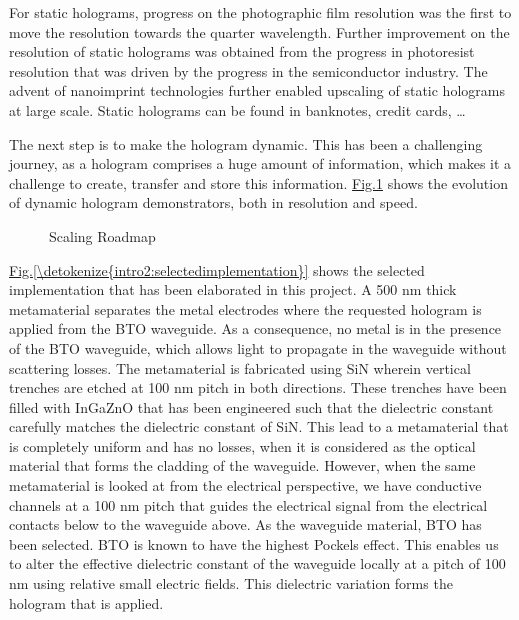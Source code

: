 \documentclass[a4paper,10pt,english,openany,oneside]{jupyterBook}
\begin{document}
\sphinxAtStartPar
For static holograms, progress on the photographic film resolution was the first to move the resolution towards the quarter wavelength. Further improvement on the resolution of static holograms was obtained from the progress in photoresist resolution that was driven by the progress in the semiconductor industry. The advent of nano\sphinxhyphen{}imprint technologies further enabled upscaling of static holograms at large scale. Static holograms can be found in banknotes, credit cards, …

\sphinxAtStartPar
The next step is to make the hologram dynamic. This has been a challenging journey, as a hologram comprises a huge amount of information, which makes it a challenge to create, transfer and store this information. \hyperref[\detokenize{intro2:scalingroadmap}]{Fig.\@ \ref{\detokenize{intro2:scalingroadmap}}} shows the evolution of dynamic hologram demonstrators, both in resolution and speed.

\begin{figure}[htbp]
\centering
\capstart

\noindent{}
\caption{Scaling Roadmap}\label{\detokenize{intro2:scalingroadmap}}\end{figure}

\begin{DUlineblock}{0em}
\item[] 
\end{DUlineblock}

\sphinxAtStartPar
\hyperref[\detokenize{intro2:selectedimplementation}]{Fig.\@ \ref{\detokenize{intro2:selectedimplementation}}} shows the selected implementation that has been elaborated in this project. A 500 nm thick metamaterial separates the metal electrodes where the requested hologram is applied from the BTO waveguide. As a consequence, no metal is in the presence of the BTO waveguide, which allows light to propagate in the waveguide without scattering losses. The metamaterial is fabricated using SiN wherein vertical trenches are etched at 100 nm pitch in both directions. These trenches have been filled with InGaZnO that has been engineered such that the dielectric constant carefully matches the dielectric constant of SiN.  This lead to a metamaterial that is completely uniform and has no losses, when it is considered as the optical material that forms the cladding of the waveguide. However, when the same metamaterial is looked at from the electrical perspective, we have conductive channels at a 100 nm pitch that guides the electrical signal from the electrical contacts below to the waveguide above.
As the waveguide material, BTO has been selected. BTO is known to have the highest Pockels effect. This enables us to alter the effective dielectric constant of the waveguide locally at a pitch of 100 nm using relative small electric fields. This dielectric variation forms the hologram that is applied.
\end{document}
